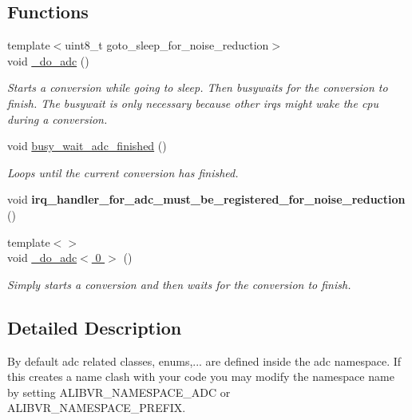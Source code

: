\subsection*{Functions}
\begin{DoxyCompactItemize}
\item 
{\footnotesize template$<$uint8\+\_\+t goto\+\_\+sleep\+\_\+for\+\_\+noise\+\_\+reduction$>$ }\\void \hyperlink{namespaceadc_ab569dff590b3bb745fb012aa29ec5723}{\+\_\+do\+\_\+adc} ()
\begin{DoxyCompactList}\small\item\em Starts a conversion while going to sleep. Then busywaits for the conversion to finish. The busywait is only necessary because other irqs might wake the cpu during a conversion. \end{DoxyCompactList}\item 
void \hyperlink{namespaceadc_a4228912d1c32eafc1987a8adb80f4984}{busy\+\_\+wait\+\_\+adc\+\_\+finished} ()\hypertarget{namespaceadc_a4228912d1c32eafc1987a8adb80f4984}{}\label{namespaceadc_a4228912d1c32eafc1987a8adb80f4984}

\begin{DoxyCompactList}\small\item\em Loops until the current conversion has finished. \end{DoxyCompactList}\item 
void {\bfseries irq\+\_\+handler\+\_\+for\+\_\+adc\+\_\+must\+\_\+be\+\_\+registered\+\_\+for\+\_\+noise\+\_\+reduction} ()\hypertarget{namespaceadc_a0f2e8fa37ba3e91fc9e7a58e3543eaaa}{}\label{namespaceadc_a0f2e8fa37ba3e91fc9e7a58e3543eaaa}

\item 
{\footnotesize template$<$$>$ }\\void \hyperlink{namespaceadc_a6e0b185b550424440d92bc2b129f6128}{\+\_\+do\+\_\+adc$<$ 0 $>$} ()
\begin{DoxyCompactList}\small\item\em Simply starts a conversion and then waits for the conversion to finish. \end{DoxyCompactList}\end{DoxyCompactItemize}


\subsection{Detailed Description}
By default adc related classes, enums,... are defined inside the {\ttfamily adc} namespace. If this creates a name clash with your code you may modify the namespace name by setting A\+L\+I\+B\+V\+R\+\_\+\+N\+A\+M\+E\+S\+P\+A\+C\+E\+\_\+\+A\+DC or A\+L\+I\+B\+V\+R\+\_\+\+N\+A\+M\+E\+S\+P\+A\+C\+E\+\_\+\+P\+R\+E\+F\+IX. 

